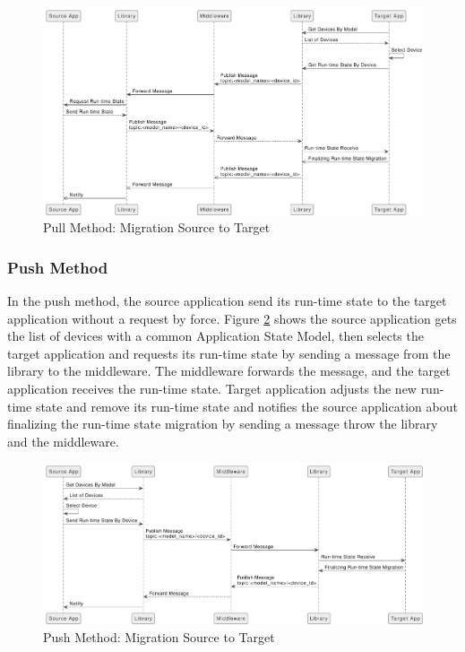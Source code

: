 \FloatBarrier \begin{figure}[H]
    \includegraphics[width=\linewidth]{../figures/Pull-Method.pdf}
    \centering
    \caption{Pull Method: Migration Source to Target}
    \label{fig:Pull-Method}
\end{figure} \FloatBarrier

\subsubsection{Push Method}
In the push method, the source application send its run-time state to the target application without a request by force. Figure \ref{fig:Push-Method} shows the source application gets the list of devices with a common Application State Model, then selects the target application and requests its run-time state by sending a message from the library to the middleware. The middleware forwards the message, and the target application receives the run-time state. Target application adjusts the new run-time state and remove its run-time state and notifies the source application about finalizing the run-time state migration by sending a message throw the library and the middleware.

\FloatBarrier \begin{figure}[H]
    \includegraphics[width=\linewidth]{../figures/Push-Method.pdf}
    \centering
    \caption{Push Method: Migration Source to Target}
    \label{fig:Push-Method}
\end{figure} \FloatBarrier

